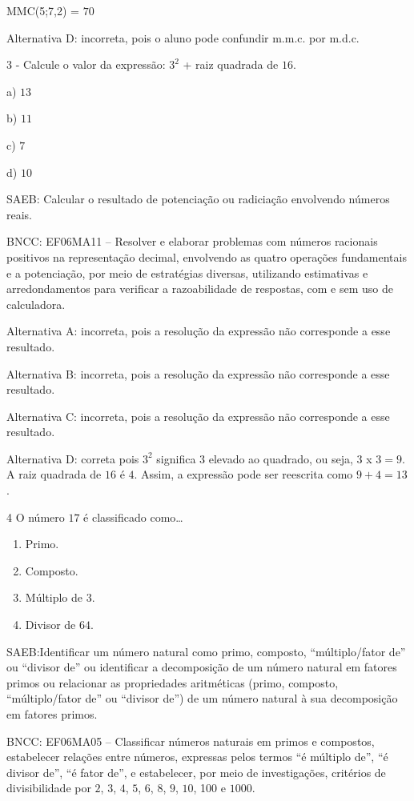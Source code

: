 MMC(5;7,2) = $70$

Alternativa D: incorreta, pois o aluno pode confundir m.m.c. por m.d.c.

3 - Calcule o valor da expressão: $3^2$ + raiz quadrada de $16$.

a) $13$

b) $11$

c) $7$

d) $10$

SAEB: Calcular o resultado de potenciação ou radiciação envolvendo
números reais.

BNCC: EF06MA11 -- Resolver e elaborar problemas com números racionais
positivos na representação decimal, envolvendo as quatro operações
fundamentais e a potenciação, por meio de estratégias diversas,
utilizando estimativas e arredondamentos para verificar a razoabilidade
de respostas, com e sem uso de calculadora.

Alternativa A: incorreta, pois a resolução da expressão não corresponde
a esse resultado.

Alternativa B: incorreta, pois a resolução da expressão não corresponde
a esse resultado.

Alternativa C: incorreta, pois a resolução da expressão não corresponde
a esse resultado.

Alternativa D: correta pois $3^2$ significa $3$ elevado ao quadrado, ou seja,
3 x $3 = 9$. A raiz quadrada de $16$ é $4$. Assim, a expressão pode ser
reescrita como $9 + 4 = 13$.

\num{4}  O número $17$ é classificado como\ldots{}

\begin{enumerate}
\def\labelenumi{\alph{enumi})}
\item
  Primo.
\item
  Composto.
\item
  Múltiplo de $3$.
\item
  Divisor de $64$.
\end{enumerate}

SAEB:Identificar um número natural como primo, composto,
``múltiplo/fator de'' ou ``divisor de'' ou identificar a decomposição de
um número natural em fatores primos ou relacionar as propriedades
aritméticas (primo, composto, ``múltiplo/fator de'' ou ``divisor de'')
de um número natural à sua decomposição em fatores primos.

BNCC: EF06MA05 -- Classificar números naturais em primos e compostos,
estabelecer relações entre números, expressas pelos termos ``é múltiplo
de'', ``é divisor de'', ``é fator de'', e estabelecer, por meio de
investigações, critérios de divisibilidade por $2$, $3$, $4$, $5$, $6$, $8$, $9$, $10$,
100 e $1000$.

